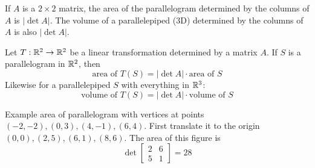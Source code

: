     \begin{card}

    \begin{theorem}\label{th-area-vol}
    If $A$ is a $2 \times 2$ matrix, the area of the parallelogram determined
    by the columns of $A$ is $|\det A|$. The volume of a parallelepiped (3D)
    determined by the columns of $A$ is also $|\det A|$.
    \end{theorem}

    \begin{theorem}\label{th-trans-area-vol}
        Let $T: \mathbb{R}^2 \to \mathbb{R}^2$ be a linear transformation determined by a
        matrix $A$. If $S$ is a parallelogram in $\mathbb{R}^2$, then
        $$
            \text{area of } T(S) = |\det A| \cdot \text{area of } S
        $$
        Likewise for a parallelepiped $S$ with everything in $\mathbb{R}^3$:
        $$
            \text{volume of } T(S) = |\det A| \cdot \text{volume of } S
        $$
    \end{theorem}

    \begin{compactdesc}
    \item[Example area of] parallelogram with vertices at points
        $(-2,-2), (0,3), (4,-1), (6,4)$. First translate it to the origin
        $(0,0), (2,5), (6,1), (8,6)$. The area of this figure is
        $$
        \det\begin{bmatrix} 2 & 6 \\ 5 & 1 \end{bmatrix} = 28
        $$


\end{compactdesc}
\end{card}
